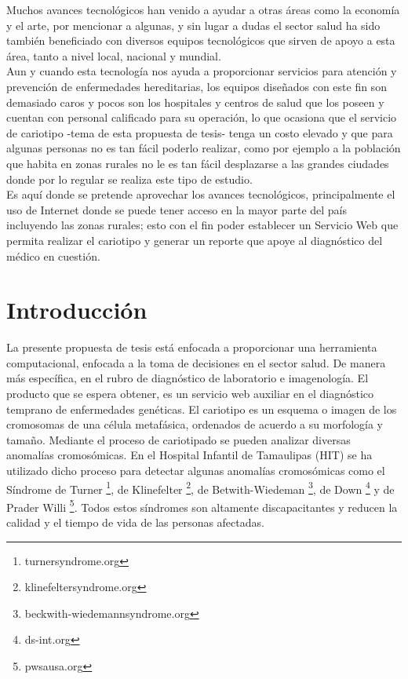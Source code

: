 \documentclass[12pt,letterpaper,titlepage]{article}
\begin{document}
Muchos avances tecnológicos han venido a ayudar a otras áreas como la economía y el arte, por mencionar a algunas, y sin lugar a dudas el sector salud ha sido también beneficiado con diversos equipos tecnológicos que sirven de apoyo a esta área, tanto a nivel local, nacional y mundial.\\

Aun y cuando esta tecnología nos ayuda a proporcionar servicios para atención y prevención de enfermedades hereditarias, los equipos diseñados con este fin son demasiado caros y pocos son los hospitales y centros de salud que los poseen y cuentan con personal calificado para su operación, lo que ocasiona que el servicio de cariotipo -tema de esta propuesta de tesis- tenga un costo elevado y que para algunas personas no es tan fácil poderlo realizar, como por ejemplo a la población que habita en zonas rurales no le es tan fácil desplazarse a las grandes ciudades donde por lo regular se realiza este tipo de estudio.\\

Es aquí donde se pretende aprovechar los avances tecnológicos, principalmente el uso de Internet donde se puede tener acceso en la mayor parte del país incluyendo las zonas rurales; esto con el fin poder establecer un Servicio Web que permita realizar el cariotipo y generar un reporte que apoye al diagnóstico del médico en cuestión.\\

\section{Introducción}\label{intro}
La presente propuesta de tesis está enfocada a proporcionar una herramienta computacional, enfocada a la toma de decisiones en el sector salud. De manera más específica, en el rubro de diagnóstico de laboratorio e imagenología. El producto que se espera obtener, es un servicio web auxiliar en el diagnóstico temprano de enfermedades genéticas. El cariotipo es un esquema o imagen de los cromosomas de una célula metafásica, ordenados de acuerdo a su morfología y tamaño. Mediante el proceso de cariotipado se pueden analizar diversas anomalías cromosómicas. En el Hospital Infantil de Tamaulipas (HIT) se ha utilizado dicho proceso para detectar algunas anomalías cromosómicas como el Síndrome de Turner \footnote{turnersyndrome.org}, de Klinefelter \footnote{klinefeltersyndrome.org}, de Betwith-Wiedeman \footnote{beckwith-wiedemannsyndrome.org}, de Down \footnote{ds-int.org} y de Prader Willi \footnote{pwsausa.org}. Todos estos síndromes son altamente discapacitantes y reducen la calidad y el tiempo de vida de las personas afectadas. \\
\end{document}

